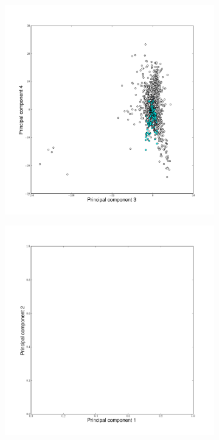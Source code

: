 \begin{landscape}
\begin{figure}
\begin{flushleft}
\begin{subfigure}[t]{0.42\textwidth}
	\end{subfigure}
	\\
	\hspace{-2cm}
	\begin{subfigure}[t]{0.42\textwidth}
	\includegraphics[width=1\textwidth]{./img/PCAcoor23.png}
	\end{subfigure}
	\begin{subfigure}[t]{0.42\textwidth}
	\includegraphics[width=1\textwidth]{./img/PCAncoor01.png}

\end{subfigure}
\end{flushleft}
\end{figure}
\end{landscape}
